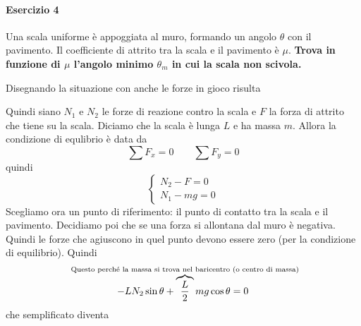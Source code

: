 \paragraph{Esercizio 4}
Una scala uniforme è appoggiata al muro, formando un angolo $\theta$ con il pavimento. Il coefficiente
di attrito tra la scala e il pavimento è $\mu$. \textbf{Trova in funzione di $\mu$ l'angolo minimo
$\theta_m$ in cui la scala non scivola.}
\divisor

Disegnando la situazione con anche le forze in gioco risulta
\begin{center}
\end{center}
Quindi siano $N_1$ e $N_2$ le forze di reazione contro la scala e $F$ la forza di attrito che tiene su
la scala. Diciamo che la scala è lunga $L$ e ha massa $m$. Allora la condizione di equlibrio è data
da
\begin{equation*}
  \sum F_x = 0 \qquad \sum F_y = 0
\end{equation*}
quindi
\begin{equation*}
  \begin{cases}
    N_2-F=0\\
    N_1-mg=0
  \end{cases}
\end{equation*}
Scegliamo ora un punto di riferimento: il punto di contatto tra la scala e il pavimento. Decidiamo
poi che se una forza si allontana dal muro è negativa. Quindi le forze che agiuscono in quel punto
devono essere zero (per la condizione di equilibrio). Quindi
\begin{equation*}
  -LN_2\sin\theta + \overbrace{\frac{L}{2}}^{\mathclap{\text{Questo perché la massa si trova nel 
  baricentro (o centro di massa)}}}mg\cos\theta = 0
\end{equation*}
che semplificato diventa
